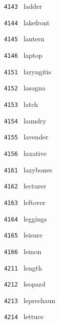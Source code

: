 \documentclass[11pt]{article}
\begin{document}
\begin{multicols}{6}
\noindent \texttt{ 4143 } \hspace{1mm} ladder  \par
\noindent \texttt{ 4144 } \hspace{1mm} lakefront  \par
\noindent \texttt{ 4145 } \hspace{1mm} lantern  \par
\noindent \texttt{ 4146 } \hspace{1mm} laptop  \par
\noindent \texttt{ 4151 } \hspace{1mm} laryngitis  \par
\noindent \texttt{ 4152 } \hspace{1mm} lasagna  \par
\noindent \texttt{ 4153 } \hspace{1mm} latch  \par
\noindent \texttt{ 4154 } \hspace{1mm} laundry  \par
\noindent \texttt{ 4155 } \hspace{1mm} lavender  \par
\noindent \texttt{ 4156 } \hspace{1mm} laxative  \par
\noindent \texttt{ 4161 } \hspace{1mm} lazybones  \par
\noindent \texttt{ 4162 } \hspace{1mm} lecturer  \par
\noindent \texttt{ 4163 } \hspace{1mm} leftover  \par
\noindent \texttt{ 4164 } \hspace{1mm} leggings  \par
\noindent \texttt{ 4165 } \hspace{1mm} leisure  \par
\noindent \texttt{ 4166 } \hspace{1mm} lemon  \par
\noindent \texttt{ 4211 } \hspace{1mm} length  \par
\noindent \texttt{ 4212 } \hspace{1mm} leopard  \par
\noindent \texttt{ 4213 } \hspace{1mm} leprechaun  \par
\noindent \texttt{ 4214 } \hspace{1mm} lettuce  \par

\end{multicols}
\end{document}
